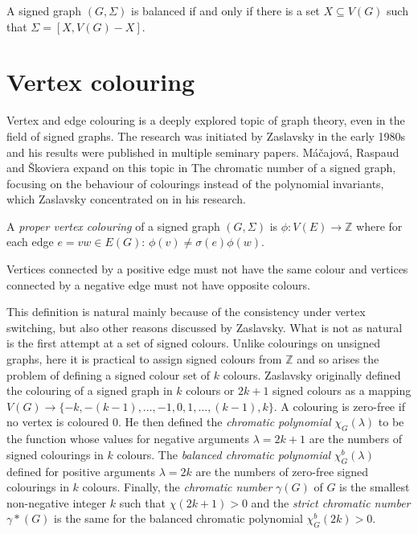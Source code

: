 \begin{theorem}\label{vertex-set-partition}
A signed graph $(G, \Sigma)$ is balanced if and only if there is a set $X \subseteq V(G)$ such that $\Sigma = [X, V(G) - X]$.
\end{theorem}

\section{Vertex colouring}

Vertex and edge colouring is a deeply explored topic of graph theory, even in the field of signed graphs.
The research was initiated by Zaslavsky\cite{zaslavsky-graphs} in the early 1980s and his results were published in multiple seminary papers\cite{zaslavsky-invariants,zaslavsky-colouring,zaslavsky-colourful}.
Máčajová, Raspaud and Škoviera expand on this topic in The chromatic number of a signed graph\cite{chromatic-number},
focusing on the behaviour of colourings instead of the polynomial invariants, which Zaslavsky concentrated on in his research.

A \textit{proper vertex colouring} of a signed graph $(G, \Sigma)$ is
$\phi : V(E) \rightarrow \mathbb{Z}$
where for each edge $e = vw \in E(G)$: $\phi (v) \neq \sigma (e) \phi (w)$.

Vertices connected by a positive edge must not have the same colour and vertices connected by a negative edge must not have opposite colours.

This definition is natural mainly because of the consistency under vertex switching, but also other reasons discussed by Zaslavsky.
What is not as natural is the first attempt at a set of signed colours.
Unlike colourings on unsigned graphs, here it is practical to assign signed colours from $\mathbb{Z}$ and so arises the problem of defining a signed colour set of $k$ colours.
Zaslavsky originally defined the colouring of a signed graph in $k$ colours or $2k+1$ signed colours as
a mapping $V(G) \rightarrow \{-k, -(k-1), \dots, -1,0,1, \dots , (k-1), k\}$.
A colouring is zero-free if no vertex is coloured 0. He then defined the \textit{chromatic polynomial} $\chi _G (\lambda)$ to be the function
whose values for negative arguments $\lambda = 2k + 1$ are the numbers of signed colourings in $k$ colours. The \textit{balanced chromatic polynomial}
$\chi _G ^b (\lambda)$ defined
for positive arguments $\lambda = 2k$ are the numbers of zero-free signed colourings in $k$ colours.
Finally, the \textit{chromatic number} $\gamma(G)$ of $G$ is the smallest non-negative integer $k$ such that $\chi (2k+1) > 0$ and the \textit{strict chromatic number} $\gamma * (G)$ is the
same for the balanced chromatic polynomial $\chi _G ^b (2k) > 0$.

